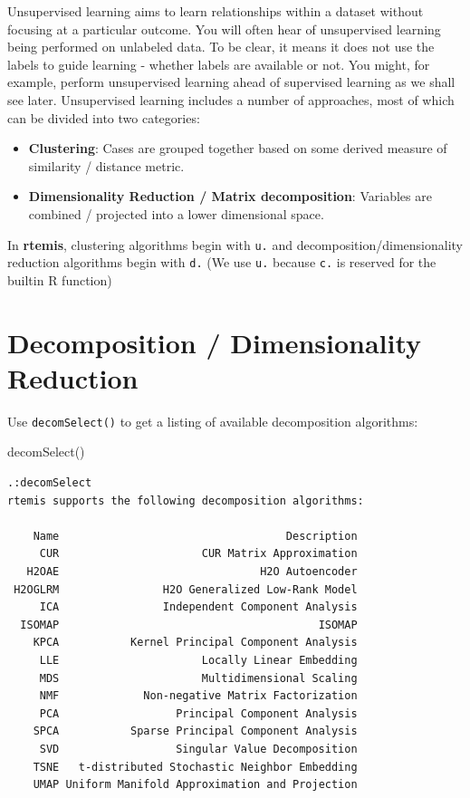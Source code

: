 \documentclass[
]{book}
\newenvironment{Shaded}{\begin{snugshade}}{\end{snugshade}}
\newcommand{\FunctionTok}[1]{\textcolor[rgb]{0.00,0.00,0.00}{#1}}
\newcommand{\NormalTok}[1]{#1}
\providecommand{\tightlist}{%
  \setlength{\itemsep}{0pt}\setlength{\parskip}{0pt}}
\begin{document}
Unsupervised learning aims to learn relationships within a dataset without focusing at a particular outcome. You will often hear of unsupervised learning being performed on unlabeled data. To be clear, it means it does not use the labels to guide learning - whether labels are available or not. You might, for example, perform unsupervised learning ahead of supervised learning as we shall see later. Unsupervised learning includes a number of approaches, most of which can be divided into two categories:

\begin{itemize}
\tightlist
\item
  \textbf{Clustering}: Cases are grouped together based on some derived measure of similarity / distance metric.
\item
  \textbf{Dimensionality Reduction / Matrix decomposition}: Variables are combined / projected into a lower dimensional space.
\end{itemize}

In \textbf{rtemis}, clustering algorithms begin with \texttt{u.} and decomposition/dimensionality reduction algorithms begin with \texttt{d.} (We use \texttt{u.} because \texttt{c.} is reserved for the builtin R function)

\hypertarget{decomposition}{%
\section{Decomposition / Dimensionality Reduction}\label{decomposition}}

Use \texttt{decomSelect()} to get a listing of available decomposition algorithms:

\begin{Shaded}
\begin{Highlighting}[]
\FunctionTok{decomSelect}\NormalTok{()}
\end{Highlighting}
\end{Shaded}

\begin{verbatim}
.:decomSelect
rtemis supports the following decomposition algorithms:

    Name                                   Description
     CUR                      CUR Matrix Approximation
   H2OAE                               H2O Autoencoder
 H2OGLRM                H2O Generalized Low-Rank Model
     ICA                Independent Component Analysis
  ISOMAP                                        ISOMAP
    KPCA           Kernel Principal Component Analysis
     LLE                      Locally Linear Embedding
     MDS                      Multidimensional Scaling
     NMF             Non-negative Matrix Factorization
     PCA                  Principal Component Analysis
    SPCA           Sparse Principal Component Analysis
     SVD                  Singular Value Decomposition
    TSNE   t-distributed Stochastic Neighbor Embedding
    UMAP Uniform Manifold Approximation and Projection
\end{verbatim}
\end{document}
